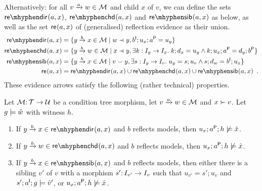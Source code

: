 Alternatively: for all $\trip vaw\in\cM$ and child $x$ of $v$, we can define the sets $\sdir{a,x}$, $\schd{a,x}$ and $\ssib{a,x}$ as below, as well as the set $\mathsf{re}_{}(a,x)$ of (generalised) reflection evidence as their union.
%
\begin{align*}
\sdir{a,x} ={} & \gensetof{\trip ybx\in \cM}{w\parentof y, b\I;u_x;a\P=u_y} \\
\schd{a,x} ={} & \gensetof{\trip ybw\in \cM}{x\parentof y, \exists k:I_y\to I_x\st k;d_x=u_y\wedge k;u_x;a\P=d_y;b\P} \\
\ssib{a,x} ={} & \gensetof{\trip ybx\in \cM}{v\sibling y, \exists s:I_y\to I_v\st u_y=s;u_v \wedge s;d_w=b\I;u_x} \\
\re{a,x} ={} & \sdir{a,x}\cup \schd{a,x} \cup \ssib{a,x} \enspace.
\end{align*}
%
These evidence arrows satisfy the following (rather technical) properties.
%
\begin{lemma}\label{lem:evidence}
Let  ${\mathcal{M}}{:}\, {\mathcal{T}}\rightarrow{\mathcal{U}}$ be a condition tree morphism, let $\trip vaw\in\cM$ and $x\childof v$. Let $g\models \hat w$ with witness $h$.
\begin{enumerate}
\item\label{re-dir} If $\trip ybx\in \sdir{a,x}$ and $b$ reflects models, then $u_x;a^{\mathsf P};h\not\models \hat x$.
\item\label{re-chd} If $\trip ybw\in \schd{a,x}$ and $b$ reflects models, then $u_x;a^{\mathsf P};h\not\models \hat x$.
\item\label{re-sib} If $\trip ybx\in \ssib{a,x}$ and $b$ reflects models, then either there is a sibling $v'$ of $v$ with a morphism $s'{:}\, I_{v'}\rightarrow I_v$ such that $u_{v'}=s';u_v$ and $s';a^{\mathsf I};g\models \hat v'$, or $u_x;a^{\mathsf P};h\not\models \hat x$.
\end{enumerate}
\end{lemma}
%

